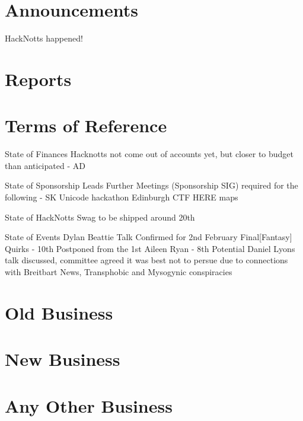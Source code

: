 \documentclass[11pt,hacksoc]{meetingmins}
\begin{document}
\maketitle

\section{Announcements}
\begin{items}
\item HackNotts happened!
\end{items}
\section{Reports}


\section{Terms of Reference}
\begin{items}
\item {State of Finances}
\subitem Hacknotts not come out of accounts yet, but closer to budget than anticipated - AD
\item {State of Sponsorship Leads}
\subitem Further Meetings (Sponsorship SIG) required for the following - SK
\subsubitem Unicode hackathon
\subsubitem Edinburgh CTF
\subsubitem HERE maps
\item {State of HackNotts}
\subitem Swag to be shipped around 20th
\item {State of Events}
\subitem Dylan Beattie Talk Confirmed for 2nd February
\subitem Final[Fantasy] Quirks - 10th 
\subsubitem Postponed from the 1st
\subitem Aileen Ryan - 8th
\subitem Potential Daniel Lyons talk discussed, committee agreed it was best not to persue due to connections with Breitbart News, Transphobic and Mysogynic conspiracies
\end{items}

\section{Old Business}

\section{New Business}
  
\section{Any Other Business}

\vspace{1em}
\end{document}
